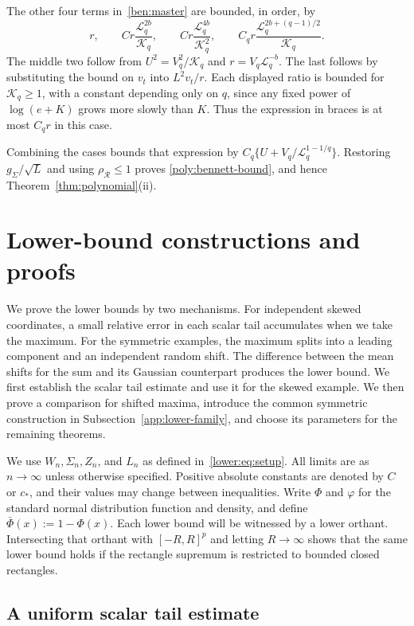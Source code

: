 \documentclass[11pt,letterpaper,twoside,leqno]{article}
\theoremstyle{bookplain}
\theoremstyle{bookremark}
\newcommand{\rh}{\rho_{\mathcal R}}
\begin{document}
The other four terms in~\eqref{ben:master} are bounded, in order, by
\[
 r,\qquad C r\frac{\mathcal L_q^{2b}}{\mathcal K_q},\qquad
 C r\frac{\mathcal L_q^{4b}}{\mathcal K_q^2},\qquad
 C_q r\frac{\mathcal L_q^{2b+(q-1)/2}}{\mathcal K_q}.
\]
The middle two follow from $U^2=V_q^2/\mathcal K_q$ and
$r=V_q\mathcal L_q^{-b}$. The last follows by substituting
the bound on $v_t$ into $L^2v_t/r$. Each displayed ratio is
bounded for $\mathcal K_q\ge1$, with a constant depending
only on $q$, since any fixed power of $\log(e+K)$ grows more
slowly than $K$. Thus the expression in braces is at most
$C_qr$ in this case.

Combining the cases bounds that expression by
$C_q\{U+V_q/\mathcal L_q^{1-1/q}\}$. Restoring
$g_\Sigma/\sqrt L$ and using $\rh\le1$ proves
\eqref{poly:bennett-bound}, and hence
Theorem~\ref{thm:polynomial}\textup{(ii)}.

\section{Lower-bound constructions and proofs}\label{app:sharpness-proofs}

We prove the lower bounds by two mechanisms. For independent skewed
coordinates, a small relative error in each scalar tail accumulates
when we take the maximum. For the symmetric examples, the maximum
splits into a leading component and an independent random shift.
The difference between the mean shifts for the sum and its Gaussian
counterpart produces the lower bound. We first establish the scalar
tail estimate and use it for the skewed example. We then prove a
comparison for shifted maxima, introduce the common symmetric
construction in Subsection~\ref{app:lower-family}, and choose its
parameters for the remaining theorems.

We use $W_n,\Sigma_n,Z_n$, and $L_n$ as defined
in~\eqref{lower:eq:setup}. All limits are as $n\to\infty$ unless
otherwise specified. Positive absolute constants are denoted by
$C$ or $c_*$, and their values may change between inequalities.
Write $\Phi$ and $\varphi$ for the standard normal distribution
function and density, and define $\bar\Phi(x):=1-\Phi(x)$.
Each lower bound will be witnessed by a lower orthant. Intersecting
that orthant with $[-R,R]^p$ and letting $R\to\infty$ shows that
the same lower bound holds if the rectangle supremum is restricted
to bounded closed rectangles.

\subsection{A uniform scalar tail estimate}
\label{app:moderate-tail-proof}
\end{document}
